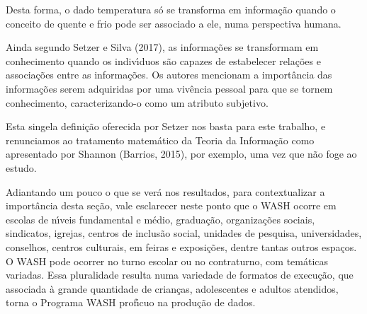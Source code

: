 \documentclass[
12pt,		%
openright,	%
twoside,  %
a4paper,			%
chapter=TITLE,		%
english,			%
french,				%
spanish,			%
brazil				%
]{USPSC-classe/USPSC}
\begin{document}
Desta forma, o dado \textquotedbl  temperatura \textquotedbl  s\'o se transforma em informa\c{c}\~ao quando o conceito de \textquotedbl  quente \textquotedbl  e \textquotedbl  frio \textquotedbl  pode ser associado a ele, numa perspectiva humana.

















Ainda segundo Setzer e Silva (2017), as informa\c{c}\~oes se transformam em conhecimento quando os indiv\'{\i}duos s\~ao capazes de estabelecer rela\c{c}\~oes e associa\c{c}\~oes entre as informa\c{c}\~oes. Os autores mencionam a import\^ancia das informa\c{c}\~oes serem adquiridas por uma viv\^encia pessoal para que se tornem conhecimento, caracterizando-o como um atributo subjetivo.

















Esta singela defini\c{c}\~ao oferecida por Setzer nos basta para este trabalho, e renunciamos ao tratamento matem\'atico da Teoria da Informa\c{c}\~ao como apresentado por Shannon (Barrios, 2015), por exemplo, uma vez que n\~ao foge ao estudo.

















Adiantando um pouco o que se ver\'a nos resultados, para contextualizar a import\^ancia desta se\c{c}\~ao, vale esclarecer neste ponto que o WASH ocorre  em escolas de n\'{\i}veis fundamental e m\'edio, gradua\c{c}\~ao, organiza\c{c}\~oes sociais, sindicatos, igrejas, centros de inclus\~ao social, unidades de pesquisa, universidades,  conselhos, centros culturais, em feiras e exposi\c{c}\~oes, dentre tantas outros espa\c{c}os. O WASH pode ocorrer no turno escolar ou no contraturno, com tem\'aticas variadas.  Essa pluralidade resulta numa variedade de formatos de execu\c{c}\~ao, que associada \`a grande quantidade de crian\c{c}as, adolescentes e adultos atendidos, torna o Programa WASH prof\'{\i}cuo na produ\c{c}\~ao de dados.
\end{document}
